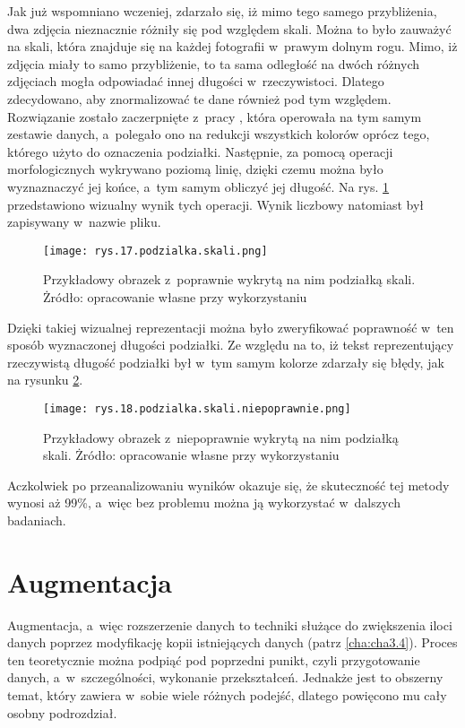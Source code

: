 Jak już wspomniano wczeniej, zdarzało się, iż mimo tego samego przybliżenia, dwa zdjęcia nieznacznie różniły się pod względem skali. Można to było zauważyć na skali, która znajduje się na każdej fotografii w~prawym dolnym rogu. Mimo, iż zdjęcia miały to samo przybliżenie, to ta sama odległość na dwóch różnych zdjęciach mogła odpowiadać innej długości w~rzeczywistoci. Dlatego zdecydowano, aby znormalizować te dane również pod tym względem. Rozwiązanie zostało zaczerpnięte z~pracy \cite{Reczek21}, która operowała na tym samym zestawie danych, a~polegało ono na redukcji wszystkich kolorów oprócz tego, którego użyto do oznaczenia podziałki. Następnie, za pomocą operacji morfologicznych wykrywano poziomą linię, dzięki czemu można było wyznaznaczyć jej końce, a~tym samym obliczyć jej długość. Na rys. \ref{fig:mesh17} przedstawiono wizualny wynik tych operacji. Wynik liczbowy natomiast był zapisywany w~nazwie pliku. 
\begin{figure}[h]
    \centering
    \texttt{[image: rys.17.podzialka.skali.png]}
    \caption{Przykładowy obrazek z~poprawnie wykrytą na nim podziałką skali. Żródło: opracowanie własne przy wykorzystaniu \cite{Reczek21, Pirowski17}}
    \label{fig:mesh17}
\end{figure}
Dzięki takiej wizualnej reprezentacji można było zweryfikować poprawność w~ten sposób wyznaczonej długości podziałki. Ze względu na to, iż tekst reprezentujący rzeczywistą długość podziałki był w~tym samym kolorze zdarzały się błędy, jak na rysunku \ref{fig:mesh18}. 
\begin{figure}[h]
    \centering
    \texttt{[image: rys.18.podzialka.skali.niepoprawnie.png]}
    \caption{Przykładowy obrazek z~niepoprawnie wykrytą na nim podziałką skali. Żródło: opracowanie własne przy wykorzystaniu \cite{Reczek21, Pirowski17}}
    \label{fig:mesh18}
\end{figure}
Aczkolwiek po przeanalizowaniu wyników okazuje się, że skuteczność tej metody wynosi aż 99\%, a~więc bez problemu można ją wykorzystać w~dalszych badaniach.

\section{Augmentacja}
\label{sec:augmentacja}

Augmentacja, a~więc rozszerzenie danych to techniki służące do zwiększenia iloci danych poprzez modyfikację kopii istniejących danych (patrz \ref{cha:cha3.4}). Proces ten teoretycznie można podpiąć pod poprzedni punikt, czyli przygotowanie danych, a~w~szczególności, wykonanie przekształceń. Jednakże jest to obszerny temat, który zawiera w~sobie wiele różnych podejść, dlatego powięcono mu cały osobny podrozdział. 


